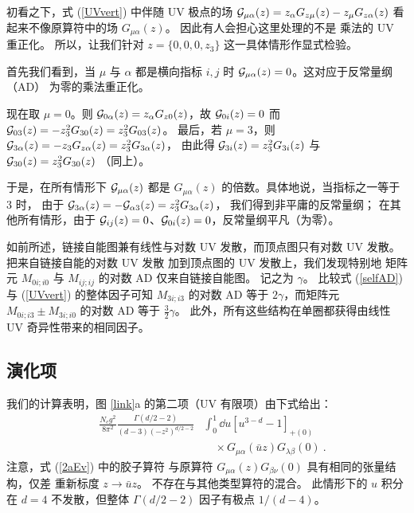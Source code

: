 初看之下，式 (\ref{UVvert}) 中伴随 UV 极点的场 ${\cal G}_{\mu\alpha}(z)=
z_{\alpha} G_{z\mu}( z) - z_{\mu} G_{z\alpha}(z)$
看起来不像原算符中的场
$G_{\mu\alpha}(z)$。
因此有人会担心这里处理的不是
乘法的 UV 重正化。
所以，让我们针对
$z= \{0,0,0,z_3 \}$ 这一具体情形作显式检验。

首先我们看到，当 $\mu$ 与 $\alpha$
都是横向指标 $i,j$ 时 ${\cal G}_{\mu\alpha}(z)=0$。这对应于反常量纲（AD）
为零的乘法重正化。

现在取 $\mu=0$。则 ${\cal G}_{0\alpha}(z)= z_{\alpha} G_{z 0}( z)$，故
${\cal G}_{0 i}(z)= 0$ 而 ${\cal G}_{0 3}(z)= -z_3^2 G_{3 0}( z) = z_3^2 G_{0 3}( z)$。
最后，若 $\mu=3$，则 ${\cal G}_{3\alpha}(z)= - z_{3} G_{z \alpha}( z) = z_3^2 G_{3 \alpha }( z)$，
由此得 ${\cal G}_{3 i}(z)= z_3^2 G_{3 i}( z)$ 与 ${\cal G}_{3 0}(z)= z_3^2 G_{3 0}( z)$
（同上）。

于是，在所有情形下 ${\cal G}_{\mu\alpha}(z)$ 都是
${G}_{\mu\alpha}(z)$ 的倍数。具体地说，当指标之一等于 3 时，
由于
${\cal G}_{3\alpha}(z)=- {\cal G}_{\alpha 3}(z)= z_3^2 G_{3 \alpha }( z)$，
我们得到非平庸的反常量纲；
在其他所有情形，由于 ${\cal G}_{ij}(z)=0$、${\cal G}_{0i}(z)=0$，反常量纲平凡（为零）。

如前所述，链接自能图兼有线性与对数
UV 发散，而顶点图只有对数
UV 发散。
把来自链接自能的对数 UV 发散
加到顶点图的 UV 发散上，我们发现特别地
矩阵元 ${ M}_{0 i; i 0}$ 与 ${ M}_{i j; i j}$ 的对数 AD 仅来自链接自能图。
记之为 $\gamma$。
比较式 (\ref{selfAD}) 与 (\ref{UVvert}) 的整体因子可知
${ M}_{3 i; i 3}$ 的对数 AD 等于 $2 \gamma$，而矩阵元
\mbox{${ M}_{0 i; i 3} \pm
{ M}_{3 i; i 0}$} 的对数 AD 等于 $\frac32 \gamma$。
此外，所有这些结构在单圈都获得由线性 UV 奇异性带来的相同因子。

\subsection{演化项}

我们的计算表明，图 \ref{link}a 的第二项（UV 有限项）由下式给出：
\begin{align}
\quad \frac{N_c g^2}{8\pi^2} \frac{\Gamma(d/2-2)}{({d-3})(-z^2)^{d/2-2}} &
\int_0^1 \dd u \left[u^{3-d}-1\right]_{+(0)} \nonumber
\\ &\quad \times
G_{\mu\alpha}( \bar uz) G_{\lambda \beta }( 0) \ .
\label{2aEv}
\end{align}
注意，式 (\ref{2aEv}) 中的胶子算符
与原算符
$G_{\mu\alpha}( z) G_{\beta \nu}( 0)$ 具有相同的张量结构，仅差
重新标度 $z \to \bar u z$。
不存在与其他类型算符的混合。
此情形下的 $u$ 积分在 $d=4$ 不发散，但整体
\mbox{$\Gamma(d/2-2)$} 因子有极点 $1/(d-4)$。


